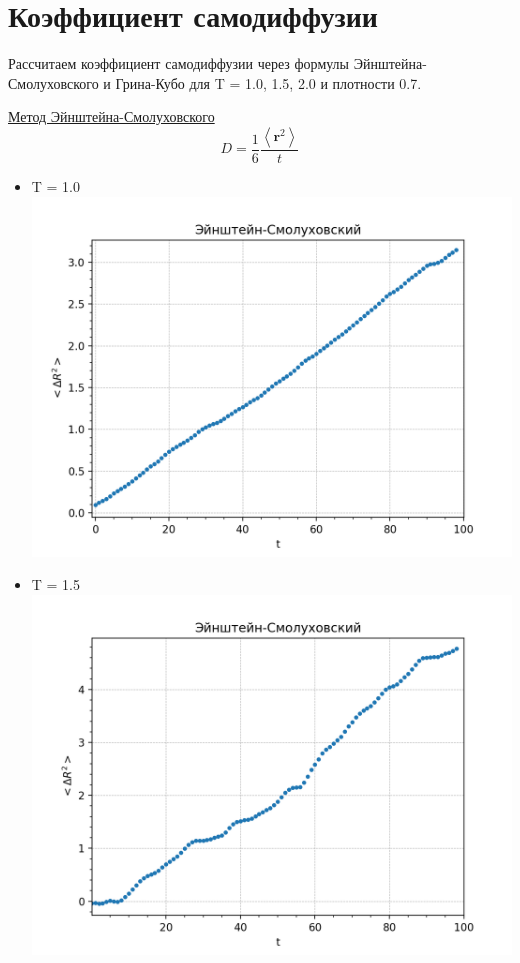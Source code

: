 \section{Коэффициент самодиффузии}

Рассчитаем коэффициент самодиффузии через формулы Эйнштейна-Смолуховского и Грина-Кубо для T = 1.0, 1.5, 2.0 и плотности 0.7. \\

\newline

\begin{minipage}{0.45\textwidth}
    \begin{center}
    \underline{Метод Эйнштейна-Смолуховского}
    $$D = \frac16\frac{\left\langle\mathbf r^2\right\rangle}t $$
    \begin{itemize}
    \item T = 1.0\\
    
    \includegraphics[width=\linewidth]{a.png}\\
    
    \item T = 1.5\\
    
    \includegraphics[width=\linewidth]{b.png}\\
    

\end{itemize}
\end{center}
\end{minipage}
